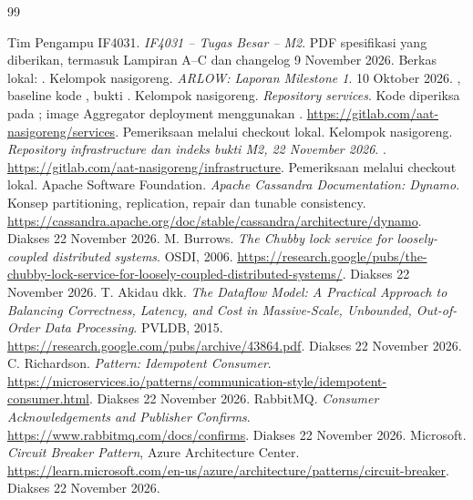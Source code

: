 \begin{thebibliography}{99}
 Tim Pengampu IF4031. \emph{IF4031 -- Tugas Besar -- M2}. PDF spesifikasi yang diberikan, termasuk Lampiran A--C dan changelog 9 November 2026. Berkas lokal: .
 Kelompok nasigoreng. \emph{ARLOW: Laporan Milestone 1}. 10 Oktober 2026. , baseline kode , bukti .
 Kelompok nasigoreng. \emph{Repository services}. Kode diperiksa pada ; image Aggregator deployment menggunakan . \url{https://gitlab.com/aat-nasigoreng/services}. Pemeriksaan melalui checkout lokal.
 Kelompok nasigoreng. \emph{Repository infrastructure dan indeks bukti M2, 22 November 2026}. . \url{https://gitlab.com/aat-nasigoreng/infrastructure}. Pemeriksaan melalui checkout lokal.
 Apache Software Foundation. \emph{Apache Cassandra Documentation: Dynamo}. Konsep partitioning, replication, repair dan tunable consistency. \url{https://cassandra.apache.org/doc/stable/cassandra/architecture/dynamo}. Diakses 22 November 2026.
 M. Burrows. \emph{The Chubby lock service for loosely-coupled distributed systems}. OSDI, 2006. \url{https://research.google/pubs/the-chubby-lock-service-for-loosely-coupled-distributed-systems/}. Diakses 22 November 2026.
 T. Akidau dkk. \emph{The Dataflow Model: A Practical Approach to Balancing Correctness, Latency, and Cost in Massive-Scale, Unbounded, Out-of-Order Data Processing}. PVLDB, 2015. \url{https://research.google.com/pubs/archive/43864.pdf}. Diakses 22 November 2026.
 C. Richardson. \emph{Pattern: Idempotent Consumer}. \url{https://microservices.io/patterns/communication-style/idempotent-consumer.html}. Diakses 22 November 2026.
 RabbitMQ. \emph{Consumer Acknowledgements and Publisher Confirms}. \url{https://www.rabbitmq.com/docs/confirms}. Diakses 22 November 2026.
 Microsoft. \emph{Circuit Breaker Pattern}, Azure Architecture Center. \url{https://learn.microsoft.com/en-us/azure/architecture/patterns/circuit-breaker}. Diakses 22 November 2026.
\end{thebibliography}
